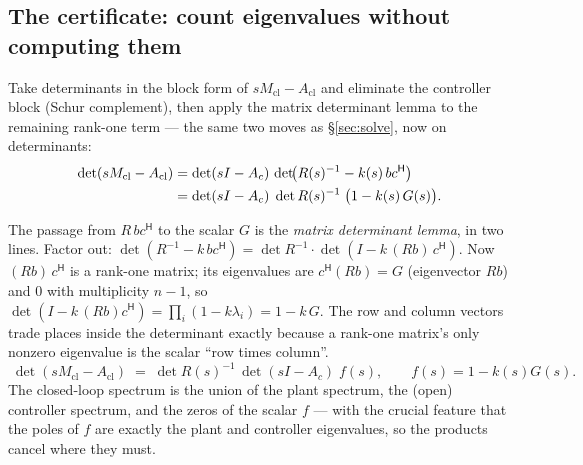 \documentclass[11pt,a4paper]{article}
\newcommand{\Mcl}{M_{\mathrm{cl}}}
\newcommand{\Acl}{A_{\mathrm{cl}}}
\newcommand{\hp}{^{\mathsf H}}
\begin{document}
{\subsection{The certificate: count eigenvalues without computing them}
Take determinants in the block form of $s\Mcl-\Acl$ and eliminate the controller block
(Schur complement), then apply the matrix determinant lemma to the remaining rank-one
term --- the same two moves as \S\ref{sec:solve}, now on determinants:
\begin{align}
\det(s\Mcl-\Acl)
&= \det(sI-A_c)\,\det\!\bigl(R(s)^{-1}-k(s)\,bc\hp\bigr) \notag\\
&= \det(sI-A_c)\;\det R(s)^{-1}\;\bigl(1-k(s)\,G(s)\bigr) .
\label{eq:factorised}
\end{align}

The passage from $R\,bc\hp$ to the scalar $G$ is the \emph{matrix determinant lemma}, in two
lines.  Factor
out: $\det(R^{-1}-k\,bc\hp)=\det R^{-1}\cdot\det(I-k\,(Rb)\,c\hp)$.  Now
$(Rb)\,c\hp$ is a rank-one matrix; its eigenvalues are $c\hp(Rb)=G$ (eigenvector $Rb$)
and $0$ with multiplicity $n-1$, so
$\det(I-k\,(Rb)c\hp)=\prod_i(1-k\lambda_i)=1-k\,G$.  The row and column vectors trade
places inside the determinant exactly because a rank-one matrix's only nonzero
eigenvalue is the scalar ``row times column''.
\begin{equation}
\boxed{\;\det(s\Mcl-\Acl)\;=\;\det R(s)^{-1}\,\det(sI-A_c)\;f(s),
\qquad f(s)=1-k(s)G(s).\;}
\end{equation}
The closed-loop spectrum is the union of the plant spectrum, the (open) controller
spectrum, and the zeros of the scalar $f$ --- with the crucial feature that the poles of
$f$ are exactly the plant and controller eigenvalues, so the products cancel where they
must.

}
\end{document}
